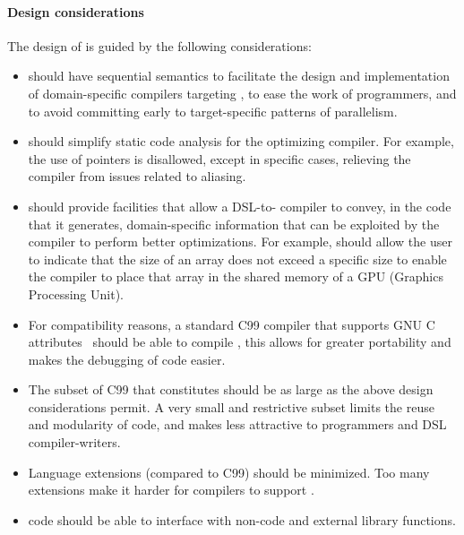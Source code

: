 \paragraph*{Design considerations}
The design of \pencil is guided by the following considerations:
\begin{itemize}
\item \pencil should have sequential semantics to facilitate the
  design and implementation of domain-specific compilers targeting
  \pencil, to ease the work of \pencil programmers, and to avoid committing
  early to target-specific patterns of parallelism.


\item \pencil should simplify static code analysis for the optimizing compiler.
  For example, the use of pointers is disallowed, except in specific cases,
  relieving the compiler from issues related to aliasing.

\item \pencil should provide facilities that allow a DSL-to-\pencil
  compiler to convey, in the \pencil code that it generates,
  domain-specific information that can be exploited by the
  compiler to perform better optimizations.  For example, \pencil
  should allow the user to indicate that the size of an array does not
  exceed a specific size to enable the compiler to place
  that array in the shared memory of a GPU (Graphics Processing Unit).

\item For compatibility reasons, a standard C99 compiler that supports
  GNU C attributes~\cite{gccguide} should be able to compile \pencil, this allows for
  greater portability and makes the debugging of \pencil code easier.

\item The subset of C99 that constitutes \pencil should
  be as large as the above design  considerations permit.
  A very small and restrictive subset limits the reuse and
  modularity of \pencil code, and makes
  \pencil less attractive to programmers and
  DSL compiler-writers.

\item Language extensions (compared to C99) should be minimized.
  Too many extensions make it harder for compilers
  to support \pencil.

\item \pencil code should be able to interface with non-\pencil code
  and external library functions.
\end{itemize}


